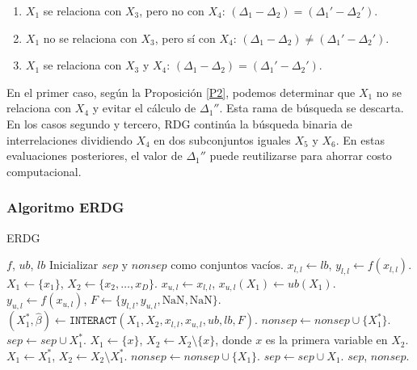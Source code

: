 \begin{enumerate}
	\item \(X_1\) se relaciona con \(X_3\), pero no con \(X_4\): \((\Delta_1 - \Delta_2) = (\Delta_1' - \Delta_2')\).
	\item \(X_1\) no se relaciona con \(X_3\), pero sí con \(X_4\): \((\Delta_1 - \Delta_2) \neq (\Delta_1' - \Delta_2')\).
	\item \(X_1\) se relaciona con \(X_3\) y \(X_4\): \((\Delta_1 - \Delta_2) = (\Delta_1' - \Delta_2')\).
\end{enumerate}

En el primer caso, según la Proposición \ref{P2}, podemos determinar que \(X_1\) no se relaciona con \(X_4\) y evitar el cálculo de \(\Delta_1''\). Esta rama de búsqueda se descarta. En los casos segundo y tercero, RDG continúa la búsqueda binaria de interrelaciones dividiendo \(X_4\) en dos subconjuntos iguales \(X_5\) y \(X_6\). En estas evaluaciones posteriores, el valor de \(\Delta_1''\) puede reutilizarse para ahorrar costo computacional.

\subsubsection{Algoritmo ERDG}
\begin{algorithm}
\caption{ERDG}
\label{alg:ERDG}
\begin{algorithmic}[1]
\REQUIRE $f$, $ub$, $lb$
\STATE Inicializar $sep$ y $nonsep$ como conjuntos vacíos.
\STATE $x_{l,l} \gets lb$, $y_{l,l} \gets f(x_{l,l})$.
\STATE $X_1 \gets \{x_1\}$, $X_2 \gets \{x_2, \ldots, x_D\}$.
    \STATE $x_{u,l} \gets x_{l,l}$, $x_{u,l}(X_1) \gets ub(X_1)$.
    \STATE $y_{u,l} \gets f(x_{u,l})$, $F \gets \{y_{l,l}, y_{u,l}, \text{NaN}, \text{NaN}\}$.
    \STATE $(X_1^*, \hat{\beta}) \gets \texttt{INTERACT}(X_1, X_2, x_{l,l}, x_{u,l}, ub, lb, F)$.
            \STATE $nonsep \gets nonsep \cup \{X_1^*\}$.
        \ELSE
            \STATE $sep \gets sep \cup X_1^*$.
        \ENDIF
        \STATE $X_1 \gets \{x\}$, $X_2 \gets X_2 \setminus \{x\}$, donde $x$ es la primera variable en $X_2$.
    \ELSE
        \STATE $X_1 \gets X_1^*$, $X_2 \gets X_2 \setminus X_1^*$.
    \ENDIF
            \STATE $nonsep \gets nonsep \cup \{X_1\}$.
        \ELSE
            \STATE $sep \gets sep \cup X_1$.
        \ENDIF
    \ENDIF
\ENDWHILE
\RETURN $sep$, $nonsep$.
\end{algorithmic}
\end{algorithm}

